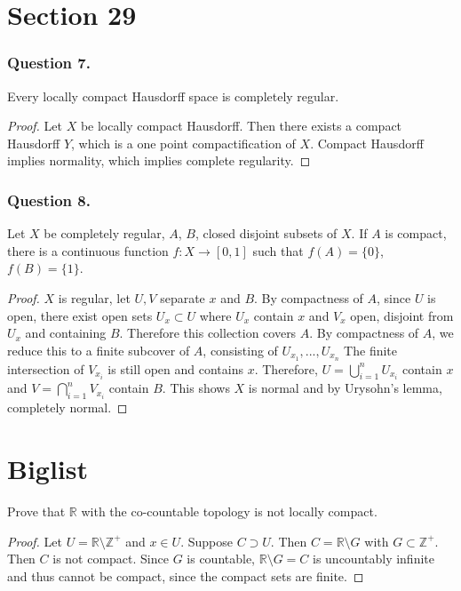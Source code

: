 \documentclass[12pt]{article}
\begin{document}
\section{Section 29}
\subsubsection*{Question 7.}
Every locally compact Hausdorff space is completely regular.
\begin{proof}
    Let $X$ be locally compact Hausdorff. Then there exists 
    a compact Hausdorff $Y$, which is a one point compactification of 
    $X$. Compact Hausdorff implies normality, which implies complete regularity.

\end{proof}

\subsubsection*{Question 8.} Let $X$ be completely regular, $A$, $B$, closed 
disjoint subsets of $X$. If $A$ is compact, there is a continuous 
function $f: X \rightarrow [0, 1]$ such that $f(A) = \{0\}$, $f(B) = \{1\}$.
\begin{proof}

    $X$ is regular, let $U, V$ separate $x$ and $B$. By compactness of $A$,
    since $U$ is open, there exist open sets $U_x \subset U$ where $U_x$ contain $x$
    and $V_x$ open, disjoint from $U_x$ and containing $B$.
    Therefore this collection covers $A$. By compactness of $A$, 
    we reduce this to a finite subcover of $A$, consisting of $U_{x_1}, ..., U_{x_n}$
    The finite intersection of $V_{x_i}$ is still open and contains $x$. Therefore,
    $U = \bigcup_{i=1}^n U_{x_i}$ contain $x$ and $V = \bigcap_{i=1}^n V_{x_i}$ contain $B$.
    This shows $X$ is normal and by Urysohn's lemma, completely normal.

\end{proof}


\section{Biglist}
Prove that $\mathbb{R}$ with the co-countable topology is
not locally compact.

\begin{proof}
    Let
    $U = \mathbb{R} \setminus \mathbb{Z}^+$ and $x \in U$.
    Suppose $C \supset U$. Then $C = \mathbb{R} \setminus G$
    with $G \subset \mathbb{Z}^+$. Then $C$ is not compact.
    Since $G $ is countable, $\mathbb{R}\setminus G = C$ is uncountably infinite and thus cannot 
    be compact, since the compact sets are finite.

\end{proof}
\end{document}
